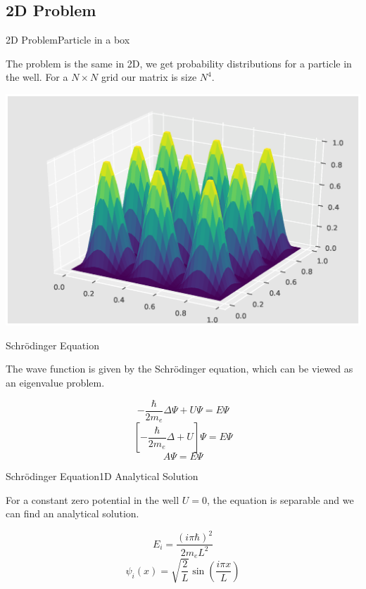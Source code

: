 \documentclass[mathserif]{beamer}
\begin{document}
\subsection{2D Problem}

\begin{frame}{2D Problem}{Particle in a box}

 The problem is the same in 2D, we get probability distributions for a particle in the well.
 For a \(N \times N\) grid our matrix is size \(N^4 \).

 \centering
 \includegraphics[scale=0.4]{images/2dp.eps}

\end{frame}

\begin{frame}{Schrödinger Equation}

 The wave function is given by the Schrödinger equation,
 which can be viewed as an eigenvalue problem.

 \[ - \frac{\hbar}{2 m_e} \Delta \Psi + U \Psi = E \Psi \]
 \[ \left[- \frac{\hbar}{2 m_e} \Delta + U \right] \Psi = E \Psi \]
 \[ A \Psi = E \Psi \]

\end{frame}

\begin{frame}{Schrödinger Equation}{1D Analytical Solution}

 For a constant zero potential in the well \(U = 0 \), the equation
 is separable and we can find an analytical solution.

 \[ E_i = \frac{{(i \pi \hbar)}^2}{2 m_e L^2} \]
 \[ \psi_i (x) = \sqrt{\frac{2}{L}} \sin \left( \frac{i \pi x }{L} \right) \]

\end{frame}
\end{document}
